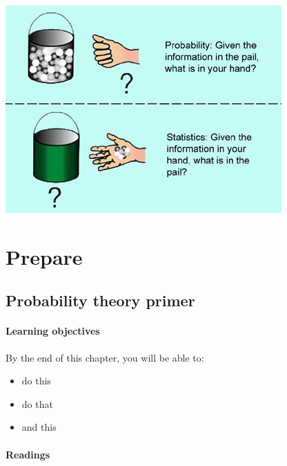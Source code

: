 \documentclass[
]{book}
\providecommand{\tightlist}{%
  \setlength{\itemsep}{0pt}\setlength{\parskip}{0pt}}
\theoremstyle{definition}
\theoremstyle{definition}
\theoremstyle{definition}
\theoremstyle{definition}
\theoremstyle{remark}
\begin{document}
\begin{center}\includegraphics[width=0.6\linewidth]{figure/00-probstats} \end{center}

\hypertarget{part-prepare}{%
\part{Prepare}\label{part-prepare}}

\hypertarget{probability-theory-primer}{%
\chapter{Probability theory primer}\label{probability-theory-primer}}

\hypertarget{learning-objectives}{%
\subsection*{Learning objectives}\label{learning-objectives}}

By the end of this chapter, you will be able to:

\begin{itemize}
\tightlist
\item
  do this
\item
  do that
\item
  and this
\end{itemize}

\hypertarget{readings}{%
\subsection*{Readings}\label{readings}}
\end{document}
